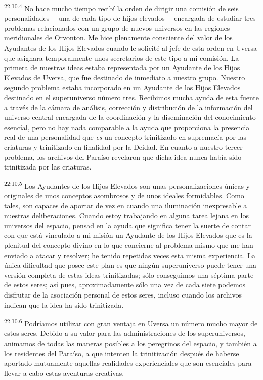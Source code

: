 \par
\textsuperscript{22:10.4} No hace mucho tiempo recibí la orden de dirigir una comisión de seis personalidades ---una de cada tipo de hijos elevados--- encargada de estudiar tres problemas relacionados con un grupo de nuevos universos en las regiones meridionales de Orvonton. Me hice plenamente consciente del valor de los Ayudantes de los Hijos Elevados cuando le solicité al jefe de esta orden en Uversa que asignara temporalmente unos secretarios de este tipo a mi comisión. La primera de nuestras ideas estaba representada por un Ayudante de los Hijos Elevados de Uversa, que fue destinado de inmediato a nuestro grupo. Nuestro segundo problema estaba incorporado en un Ayudante de los Hijos Elevados destinado en el superuniverso número tres. Recibimos mucha ayuda de esta fuente a través de la cámara de análisis, corrección y distribución de la información del universo central encargada de la coordinación y la diseminación del conocimiento esencial, pero no hay nada comparable a la ayuda que proporciona la presencia real de una personalidad que \textit{es} un concepto trinitizado en supremacía por las criaturas y trinitizado en finalidad por la Deidad. En cuanto a nuestro tercer problema, los archivos del Paraíso revelaron que dicha idea nunca había sido trinitizada por las criaturas.

\par
\textsuperscript{22:10.5} Los Ayudantes de los Hijos Elevados son unas personalizaciones únicas y originales de unos conceptos asombrosos y de unos ideales formidables. Como tales, son capaces de aportar de vez en cuando una iluminación inexpresable a nuestras deliberaciones. Cuando estoy trabajando en alguna tarea lejana en los universos del espacio, pensad en la ayuda que significa tener la suerte de contar con que está vinculado a mi misión un Ayudante de los Hijos Elevados que es la plenitud del concepto divino en lo que concierne al problema mismo que me han enviado a atacar y resolver; he tenido repetidas veces esta misma experiencia. La única dificultad que posee este plan es que ningún superuniverso puede tener una versión completa de estas ideas trinitizadas; sólo conseguimos una séptima parte de estos seres; así pues, aproximadamente sólo una vez de cada siete podemos disfrutar de la asociación personal de estos seres, incluso cuando los archivos indican que la idea ha sido trinitizada.

\par
\textsuperscript{22:10.6} Podríamos utilizar con gran ventaja en Uversa un número mucho mayor de estos seres. Debido a su valor para las administraciones de los superuniversos, animamos de todas las maneras posibles a los peregrinos del espacio, y también a los residentes del Paraíso, a que intenten la trinitización después de haberse aportado mutuamente aquellas realidades experienciales que son esenciales para llevar a cabo estas aventuras creativas.

